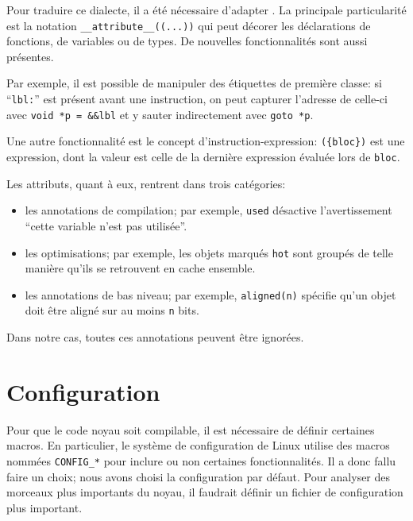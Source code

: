 Pour traduire ce dialecte, il a été nécessaire d'adapter \ctonewspeak. La
principale particularité est la notation \verb!__attribute__((...))! qui peut
décorer les déclarations de fonctions, de variables ou de types. De nouvelles
fonctionnalités sont aussi présentes.


Par exemple, il est possible de manipuler des étiquettes de première classe: si
\enquote{\texttt{lbl:}} est présent avant une instruction, on peut capturer
l'adresse de celle-ci avec \texttt{void *p = \&\&lbl} et y sauter indirectement
avec \texttt{goto *p}.

Une autre fonctionnalité est le concept d'instruction-expression:
\texttt{(\{bloc\})} est une expression, dont la valeur est celle de la dernière
expression évaluée lors de \texttt{bloc}.

Les attributs, quant à eux, rentrent dans trois catégories:

\begin{itemize}
  \item les annotations de compilation; par exemple, \texttt{used} désactive
  l'avertissement \enquote{cette variable n'est pas utilisée}.

  \item les optimisations; par exemple, les objets marqués \texttt{hot} sont
    groupés de telle manière qu'ils se retrouvent en cache ensemble.

  \item les annotations de bas niveau; par exemple, \verb!aligned(n)!
    spécifie qu'un objet doit être aligné sur au moins \texttt{n} bits.
\end{itemize}

Dans notre cas, toutes ces annotations peuvent être ignorées.


\section{Configuration}


Pour que le code noyau soit compilable, il est nécessaire de définir certaines
macros. En particulier, le système de configuration de Linux utilise des macros
nommées \texttt{CONFIG\_*} pour inclure ou non certaines fonctionnalités. Il a
donc fallu faire un choix; nous avons choisi la configuration par défaut. Pour
analyser des morceaux plus importants du noyau, il faudrait définir un fichier
de configuration plus important.

